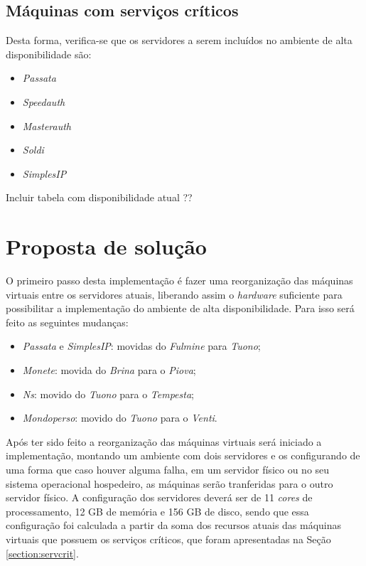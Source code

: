 \subsection{Máquinas com serviços críticos}
\label{section:maqservcrit}

Desta forma, verifica-se que os servidores a serem incluídos no ambiente de alta disponibilidade são:
\begin{itemize}
 \item \textit{Passata}
 \item \textit{Speedauth}
 \item \textit{Masterauth}
 \item \textit{Soldi}
 \item \textit{SimplesIP}
\end{itemize}

Incluir tabela com disponibilidade atual ??

\section{Proposta de solução}
\label{section:propostasolucao}

O primeiro passo desta implementação é fazer uma reorganização das máquinas virtuais entre os servidores atuais, liberando assim o 
\textit{hardware} suficiente para possibilitar a implementação do ambiente de alta disponibilidade. 
Para isso será feito as seguintes mudanças:
\begin{itemize}
 \item \textit{Passata} e \textit{SimplesIP}: movidas do \textit{Fulmine} para \textit{Tuono};
 \item \textit{Monete}: movida do \textit{Brina} para o \textit{Piova};
 \item \textit{Ns}: movido do \textit{Tuono} para o \textit{Tempesta};
 \item \textit{Mondoperso}: movido do \textit{Tuono} para o \textit{Venti}.
\end{itemize}

Após ter sido feito a reorganização das máquinas virtuais será iniciado a implementação, montando um ambiente com dois servidores e os 
configurando de uma forma que caso houver alguma falha, em um servidor físico ou no seu sistema operacional hospedeiro, as máquinas serão 
tranferidas para o outro servidor físico. 
A configuração dos servidores deverá ser de 11 \textit{cores} de processamento, 12 GB de memória e 156 GB de disco, sendo que essa configuração 
foi calculada a partir da soma dos recursos atuais das máquinas virtuais que possuem os serviços críticos, que foram apresentadas na Seção 
\ref{section:servcrit}.

